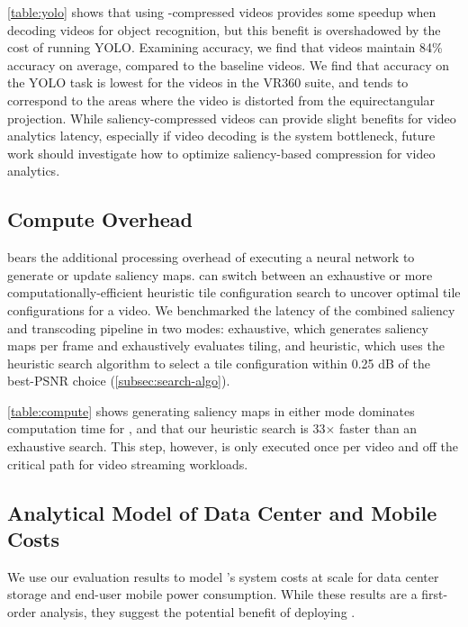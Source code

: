 \ref{table:yolo} shows that using \name-compressed videos provides some speedup when decoding videos for object recognition, but this benefit is overshadowed by the cost of running YOLO.
Examining accuracy, we find that \name videos maintain 84\% accuracy on average, compared to the baseline \hevc videos.
We find that accuracy on the YOLO task is lowest for the videos in the VR360 suite, and tends to correspond to the areas where the video is distorted from the equirectangular projection.
While saliency-compressed videos can provide slight benefits for video analytics latency, especially if video decoding is the system bottleneck, future work should investigate how to optimize saliency-based compression for video analytics.


\subsection{Compute Overhead}
\nameCompress bears the additional processing overhead of executing a neural network to generate or update saliency maps.
\nameStore can switch between an exhaustive or more computationally-efficient heuristic tile configuration search to uncover optimal tile configurations for a video.
We benchmarked the latency of the combined saliency and transcoding pipeline in two modes: exhaustive, which generates saliency maps per frame and exhaustively evaluates tiling, and heuristic, which uses the heuristic search algorithm to select a tile configuration within 0.25 dB of the best-PSNR choice (\ref{subsec:search-algo}).

\computeTable

\ref{table:compute} shows generating saliency maps in either mode dominates computation time for \name, and that our heuristic search is 33$\times$ faster than an exhaustive search.
This step, however, is only executed once per video and off the critical path for video streaming workloads.


\subsection{Analytical Model of \name Data Center and Mobile Costs}
\label{subsec:datacentermobile}
We use our evaluation results to model \name's system costs at scale for data center storage and end-user mobile power consumption. While these results are a first-order analysis, they suggest the potential benefit of deploying \name.

